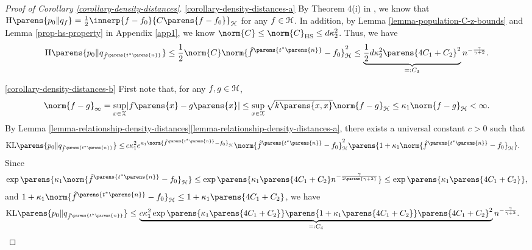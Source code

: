 \begin{proof}[Proof of Corollary \ref{corollary-density-distances}]
	\ref{corollary-density-distances-a} By Theorem 4(i) in \textcite{Sriperumbudur-density-estimation-inf-exp-family}, we know that $\Hdiv \parens{p_0 \Vert q_{f}} = \frac{1}{2} \innerp{f - f_0}{C \parens{f - f_0}}_{\calH}$ for any $f \in \mathcal{H}$. In addition, by Lemma \ref{lemma-population-C-z-bounds} and Lemma \ref{prop-hs-property} in Appendix \ref{app1}, we know $\norm{C} \le \norm{C}_{\mathrm{HS}} \le d \kappa_2^2$. Thus, we have 
	\begin{align*}
		\Hdiv \parens{p_0 \Vert q_{\hat{f}^{\parens{t^* \parens{n}}}} } \le \frac{1}{2} \norm{C} \norm{\hat{f}^{\parens{t^* \parens{n}}} - f_0}_{\calH}^2 \le \underbrace{\frac{1}{2} d \kappa_2^2 \parens{4C_1 + C_2}^2}_{=: C_3} n^{-\frac{\gamma}{\gamma + 2}}. 
	\end{align*}
	
	\ref{corollary-density-distances-b} First note that, for any $f, g \in \mathcal{H}$, 
	\begin{align*}
		\norm{f - g}_{\infty} = \sup_{x \in \calX} \abs{f \parens{x} - g \parens{x}} \le \sup_{x \in \calX} \sqrt{k \parens{x, x}} \norm{f - g}_{\calH} \le \kappa_1 \norm{f - g}_{\calH} < \infty. 
	\end{align*}
	By Lemma \ref{lemma-relationship-density-distances}\ref{lemma-relationship-density-distances-a}, there exists a universal constant $c > 0$ such that 
	\begin{align*}
		\KLdiv \parens{p_0 \Vert q_{\hat{f}^{\parens{t^* \parens{n}}}} } \le & \, c \kappa_1^2 e^{\kappa_1 \norm{ \hat{f}^{\parens{t^* \parens{n}}} - f_0}_{\calH}} \norm{ \hat{f}^{\parens{t^* \parens{n}}} - f_0}_{\calH}^2 \parens{1 + \kappa_1 \norm{ \hat{f}^{\parens{t^* \parens{n}}} - f_0}_{\calH}}. 
	\end{align*}
	Since 
	\begin{align*}
		\exp \parens{\kappa_1 \norm{ \hat{f}^{\parens{t^* \parens{n}}} - f_0}_{\calH}} \le \exp \parens{\kappa_1 \parens{4C_1 + C_2} n^{-\frac{\gamma}{2 \parens{\gamma + 2} }}} \le \exp \parens{\kappa_1 \parens{4 C_1 + C_2}}, 
	\end{align*}
	and $1 + \kappa_1 \norm{\hat{f}^{\parens{t^* \parens{n}}} - f_0}_{\hil} \le 1 + \kappa_1 \parens{4C_1 + C_2}$, we have 
	\begin{align*}
		\KLdiv \parens{p_0 \Vert q_{\hat{f}^{\parens{t^* \parens{n}}}} } \le & \, \underbrace{c \kappa_1^2 \exp \parens{\kappa_1 \parens{4C_1 + C_2}} \parens{1 + \kappa_1 \parens{4C_1 + C_2}} \parens{4C_1 + C_2}^2}_{=: C_4} n^{-\frac{\gamma}{\gamma + 2}}. 
	\end{align*}
	

\end{proof}
